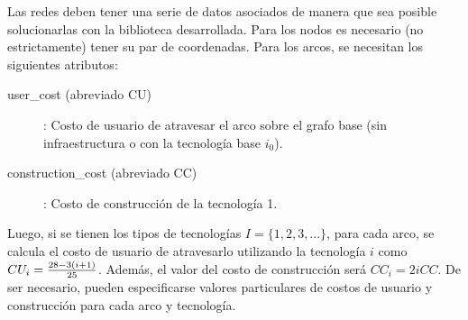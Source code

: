 Las redes deben tener una serie de datos asociados de manera que sea posible solucionarlas con la biblioteca desarrollada. Para los nodos es necesario (no estrictamente) tener su par de coordenadas. Para los arcos, se necesitan los siguientes atributos:

\begin{description}
\item[user\_cost (abreviado CU)]: Costo de usuario de atravesar el arco sobre el grafo base (sin infraestructura o con la tecnología base $i_0$).
\item[construction\_cost (abreviado CC)]: Costo de construcción de la tecnología 1.
\end{description}

Luego, si se tienen los tipos de tecnologías $I = \{1, 2, 3, ... \}$, para cada arco, se calcula el costo de usuario de atravesarlo utilizando la tecnología $i$ como $CU_i = {28 - 3 (i + 1) \over 25}$. Además, el valor del costo de construcción será $CC_i = 2i CC$. De ser necesario, pueden especificarse valores particulares de costos de usuario y construcción para cada arco y tecnología.
